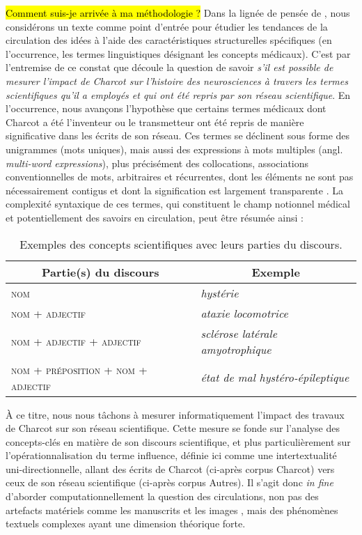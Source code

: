 \hl{Comment suis-je arrivée à ma méthodologie ?} Dans la lignée de pensée de \citet{milia2023}, nous considérons un texte comme point d'entrée pour étudier les tendances de la circulation des idées à l'aide des caractéristiques structurelles spécifiques (en l'occurrence, les termes linguistiques désignant les concepts médicaux). C'est par l'entremise de ce constat que découle la question de savoir \textit{s'il est possible de mesurer l'impact de Charcot sur l'histoire des neurosciences à travers les termes scientifiques qu'il a employés et qui ont été repris par son réseau scientifique}. En l'occurrence, nous avançons l'hypothèse que certains termes médicaux dont Charcot a été l'inventeur ou le transmetteur ont été repris de manière significative dans les écrits de son réseau. Ces termes se déclinent sous forme des unigrammes (mots uniques), mais aussi des expressions à mots multiples (angl. \textit{multi-word expressions}), plus précisément des collocations, \og{}associations conventionnelles de mots, arbitraires et récurrentes, dont les éléments ne sont pas nécessairement contigus et dont la signification est largement transparente\fg{} \citep[p. 96]{nerima2006}. La complexité syntaxique de ces termes, qui constituent le champ notionnel médical et potentiellement des savoirs en circulation, peut être résumée ainsi :
\begin{table}[h]
	\centering
	\begin{tabular}{l|l}
		\multicolumn{1}{c|}{Partie(s) du discours} & \multicolumn{1}{c}{Exemple} \\
		\hline
		\textsc{nom} & \textit{hystérie}\\
		\textsc{nom + adjectif} & \textit{ataxie locomotrice}\\
		\textsc{nom + adjectif + adjectif} & \textit{sclérose latérale amyotrophique}\\
		\textsc{nom + préposition + nom + adjectif} & \textit{état de mal hystéro-épileptique}
	\end{tabular}
	\caption{Exemples des concepts scientifiques avec leurs parties du discours.}
\end{table}

À ce titre, nous nous tâchons à mesurer informatiquement l'impact des travaux de Charcot sur son réseau scientifique. Cette mesure se fonde sur l'analyse des concepts-clés en matière de son discours scientifique, et plus particulièrement sur l'opérationnalisation du terme \og{}influence\fg{}, définie ici comme une intertextualité uni-directionnelle, allant des écrits de Charcot (ci-après corpus \og{}Charcot\fg{}) vers ceux de son réseau scientifique (ci-après corpus \og{}Autres\fg{}). Il s'agit donc \textit{in fine} d'aborder computationnellement la question des circulations, non pas des artefacts matériels comme les manuscrits \citep{gabay2021katabase} et les images \citep{joyeux2019visual}, mais des phénomènes textuels complexes \citep{manjavacas} ayant une dimension théorique forte. 
